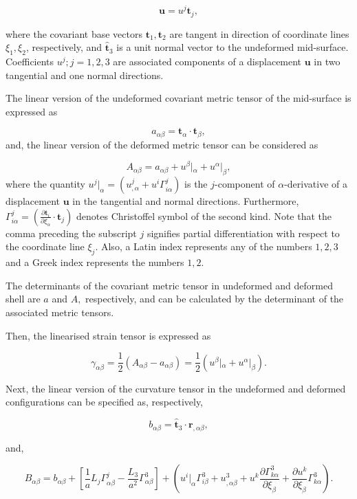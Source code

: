 \[ \mathbf{u} = u^{j}\mathbf{t}_{j}, \]

where the covariant base vectors $ \mathbf{t}_{1}, \mathbf{t}_{2} $ are tangent in direction of coordinate lines $ \xi_{1}, \xi_{2}$, respectively, and $ \mathbf{\hat{t}}_{3} $ is a unit normal vector to the undeformed mid-\/surface. Coefficients $ u^{j}; j=1,2,3$ are associated components of a displacement $ \mathbf{u} $ in two tangential and one normal directions.

The linear version of the undeformed covariant metric tensor of the mid-\/surface is expressed as

\[ a_{\alpha\beta} = \mathbf{t}_{\alpha}\cdotp \mathbf{t}_{\beta}, \] and, the linear version of the deformed metric tensor can be considered as

\[ A_{\alpha\beta} = a_{\alpha\beta} + u^{\beta}|_{\alpha} + u^{\alpha}|_{\beta}, \] where the quantity $ u^{j}|_{\alpha} = (u^{j}_{,\alpha}+u^{i}\Gamma^{j}_{i\alpha}) $ is the $ j $-\/component of $ \alpha $-\/derivative of a displacement $ \mathbf{u} $ in the tangential and normal directions. Furthermore, $ \Gamma^{j}_{i\alpha} = \left(\frac{\partial\mathbf{t}_{i}}{\partial\xi_{\alpha}}\cdotp\mathbf{t}_{j}\right) $ denotes Christoffel symbol of the second kind. Note that the comma preceding the subscript $ j $ signifies partial differentiation with respect to the coordinate line $ \xi_j. $ Also, a Latin index represents any of the numbers $ 1,2,3 $ and a Greek index represents the numbers $ 1,2. $

The determinants of the covariant metric tensor in undeformed and deformed shell are $ a $ and $ A, $ respectively, and can be calculated by the determinant of the associated metric tensors.

Then, the linearised strain tensor is expressed as

\[ \gamma_{\alpha\beta} = \frac{1}{2}\left(A_{\alpha\beta} - a_{\alpha\beta} \right) = \frac{1}{2}\left( u^{\beta}|_{\alpha} + u^{\alpha}|_{\beta} \right). \]

Next, the linear version of the curvature tensor in the undeformed and deformed configurations can be specified as, respectively,

\[ b_{\alpha\beta} = \mathbf{\hat{t}}_3\cdotp\mathbf{r}_{,\alpha\beta}, \]

and,

\[ B_{\alpha\beta} = b_{\alpha\beta} + \left[ \frac{1}{a}L_{j}\Gamma^j_{\alpha\beta} -\frac{L_{3}}{a^2}\Gamma^3_{\alpha\beta}\right] + \left( u^{i}|_{\alpha}\Gamma^{3}_{i\beta} + u^{3}_{,\alpha\beta} + u^{k}\frac{\partial \Gamma^{3}_{k\alpha}}{\partial\xi_{\beta}} + \frac{\partial u^{k}}{\partial\xi_{\beta}}\Gamma^{3}_{k\alpha}\right). \]


